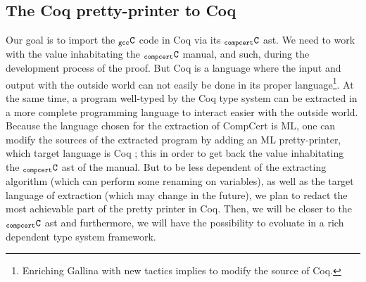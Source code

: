 \documentclass[a4paper, 11pt]{article}
\newcommand{\simgen}{{\tt simgen}\xspace}
\newcommand{\C}{$_{\tt compcert}{\tt C}$\xspace}
\newcommand{\gccC}{$_{\tt gcc}{\tt C}$\xspace}
\newcommand{\outworld}{the outside world\xspace}
\begin{document}
\subsection{The Coq pretty-printer to Coq}
Our goal is to import the \gccC code in Coq via its \C ast. We need to work with the value inhabitating the \C manual, and such, during the development process of the proof. But Coq is a language where the input and output with \outworld can not easily be done in its proper language\footnote{Enriching Gallina with new tactics implies to modify the source of Coq.}. At the same time, a program well-typed by the Coq type system can be extracted in a more complete programming language to interact easier with \outworld. Because the language chosen for the extraction of CompCert is ML, one can modify the sources of the extracted program by adding an ML pretty-printer, which target language is Coq ; this in order to get back the value inhabitating the \C ast of the manual. But to be less dependent of the extracting algorithm (which can perform some renaming on variables), as well as the target language of extraction (which may change in the future), we plan to redact the most achievable part of the pretty printer in Coq. Then, we will be closer to the \C ast and furthermore, we will have the possibility to evoluate in a rich dependent type system framework. 
\end{document}
